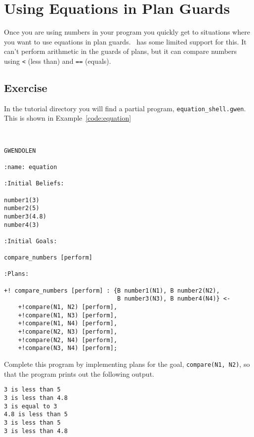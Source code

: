 \section{Using Equations in Plan Guards}
Once you are using numbers in your program you quickly get to situations where you want to use equations in plan guards.  \gwendolen\ has some limited support for this.  It can't perform arithmetic in the guards of plans, but it can compare numbers using \texttt{<} (less than) and \texttt{==} (equals).

\subsection{Exercise}
In the tutorial directory you will find a partial program, \texttt{equation\_shell.gwen}.  This is shown in Example~\ref{code:equation}

\begin{ourexample}
\label{code:equation} \quad \\
\begin{lstlisting}[basicstyle=\sffamily,style=easslisting,language=Gwendolen]
GWENDOLEN

:name: equation

:Initial Beliefs:

number1(3)
number2(5)
number3(4.8)
number4(3)

:Initial Goals:

compare_numbers [perform]

:Plans:

+! compare_numbers [perform] : {B number1(N1), B number2(N2), 
                                B number3(N3), B number4(N4)} <-
	+!compare(N1, N2) [perform],
	+!compare(N1, N3) [perform],
	+!compare(N1, N4) [perform],
	+!compare(N2, N3) [perform],
	+!compare(N2, N4) [perform],
	+!compare(N3, N4) [perform];
\end{lstlisting}
\end{ourexample}

Complete this program by implementing plans for the goal, \lstinline{compare(N1, N2)}, so that the program prints out the following output.

\begin{verbatim}
3 is less than 5
3 is less than 4.8
3 is equal to 3
4.8 is less than 5
3 is less than 5
3 is less than 4.8
\end{verbatim}


